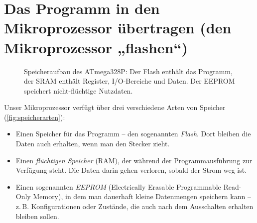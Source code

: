 \documentclass[a4paper,12pt]{article}
\begin{document}
\newpage

\section{
    Das Programm in den Mikroprozessor übertragen (den Mikroprozessor
    „flashen“)
}

\begin{figure}[ht]
\centering
{}
\caption{
    Speicheraufbau des ATmega328P: Der Flash enthält das Programm, der SRAM
    enthält Register, I/O-Bereiche und Daten. Der EEPROM speichert
    nicht-flüchtige Nutzdaten.
}
\label{fig:speicherarten}
\end{figure}

\noindent
Unser Mikroprozessor verfügt über drei verschiedene Arten von Speicher
(\autoref{fig:speicherarten}):

\begin{itemize}
    \item
	Einen Speicher für das Programm – den sogenannten \emph{Flash}. Dort
	bleiben die Daten auch erhalten, wenn man den Stecker zieht.
    \item
	Einen \emph{flüchtigen Speicher} (RAM), der während der
	Programmausführung zur Verfügung steht. Die Daten darin gehen verloren,
	sobald der Strom weg ist.
    \item
	Einen sogenannten \emph{EEPROM} (Electrically Erasable Programmable
	Read-Only Memory), in dem man dauerhaft kleine Datenmengen speichern
	kann – z.\,B. Konfigurationen oder Zustände, die auch nach dem
	Ausschalten erhalten bleiben sollen.
\end{itemize}
\end{document}
